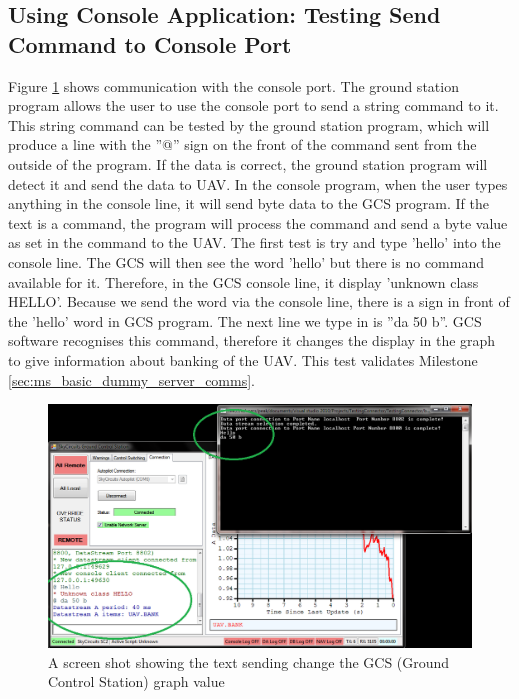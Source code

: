 \subsection{Using Console Application: Testing Send Command to Console Port}
\label{sec:send_console}
Figure \ref{test text} shows communication with the console port.
The ground station program allows the user to use the console port to send a string command to it. 
This string command can be tested by the ground station program, which will produce a line with the ''@'' sign on the front of the command sent from the outside of the program.
If the data is correct, the ground station program will detect it and send the data to UAV. 
In the console program, when the user types anything in the console line, it will send byte data to the GCS program.
If the text is a command, the program will process the command and send a byte value as set in the command to the UAV.
The first test is try and type 'hello' into the console line.
The GCS will then see the word 'hello' but there is no command available for it.
Therefore, in the GCS console line, it display 'unknown class HELLO'.
Because we send the word via the console line, there is a \@ sign in front of the 'hello' word in GCS program.
The next line we type in is ''da 50 b''.
GCS software recognises this command, therefore it changes the display in the graph to give information about banking of the UAV.
This test validates Milestone \ref{sec:ms_basic_dummy_server_comms}.
\begin{figure}[H]
\begin{center}
\includegraphics[width=1.00\textwidth]{testing_screenshots/test_sending_test_text_useful.png} 
\end{center}
\caption{A screen shot showing the text sending change the GCS (Ground Control Station) graph value\label{test text}}
\end{figure}

